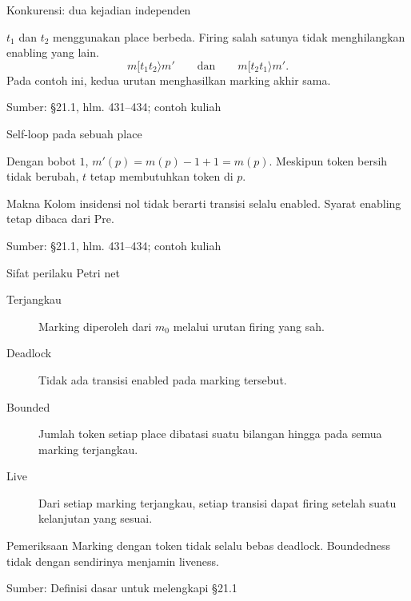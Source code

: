\documentclass[aspectratio=169,11pt]{beamer}
\newcommand{\source}[1]{%
    \vfill
    \hfill{\tiny\color{gray}Sumber: #1}
}
\newcommand{\Pre}{\mathrm{Pre}}
\newcommand{\tok}[1]{\fill[AcademicBlue] (#1.center) circle (2.2pt);}
\begin{document}
\begin{frame}{Konkurensi: dua kejadian independen}

\begin{center}\end{center}
$t_1$ dan $t_2$ menggunakan place berbeda.
Firing salah satunya tidak menghilangkan enabling yang lain.
\[
m[t_1t_2\rangle m'\qquad\text{dan}\qquad m[t_2t_1\rangle m'.
\]
Pada contoh ini, kedua urutan menghasilkan marking akhir sama.

\source{\S21.1, hlm. 431--434; contoh kuliah}
\end{frame}
\begin{frame}{Self-loop pada sebuah place}

\begin{center}\end{center}
Dengan bobot $1$, $m'(p)=m(p)-1+1=m(p)$.
Meskipun token bersih tidak berubah, $t$ tetap membutuhkan token di $p$.
\begin{block}{Makna}
Kolom insidensi nol tidak berarti transisi selalu enabled.
Syarat enabling tetap dibaca dari $\Pre$.
\end{block}

\source{\S21.1, hlm. 431--434; contoh kuliah}
\end{frame}
\begin{frame}{Sifat perilaku Petri net}

\begin{description}
\item[Terjangkau] Marking diperoleh dari $m_0$ melalui urutan firing yang sah.
\item[Deadlock] Tidak ada transisi enabled pada marking tersebut.
\item[Bounded] Jumlah token setiap place dibatasi suatu bilangan hingga pada semua marking terjangkau.
\item[Live] Dari setiap marking terjangkau, setiap transisi dapat firing setelah suatu kelanjutan yang sesuai.
\end{description}
\begin{block}{Pemeriksaan}
Marking dengan token tidak selalu bebas deadlock.
Boundedness tidak dengan sendirinya menjamin liveness.
\end{block}

\source{Definisi dasar untuk melengkapi \S21.1}
\end{frame}
\end{document}
